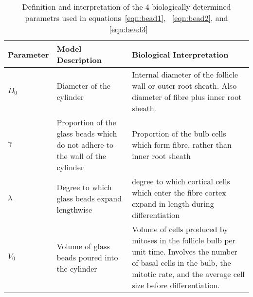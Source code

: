 %

\begin{table}[htp]
\centering
\caption{Definition and interpretation of the 4 biologically determined parametrs used in equations~\ref{eqn:bead1}, ~\ref{eqn:bead2}, and ~\ref{eqn:bead3}}
\label{tab:4param}
\vspace{0.1in}
\begin{tabular}{|p{0.6in}|p{2.0in}|p{2.2in}|}  \hline
     Parameter & Model Description  &  Biological Interpretation  \\ 
\hline 
  $D_{0}$  &  Diameter of the cylinder  &  Internal diameter of the follicle wall or outer root sheath.  Also diameter of fibre plus inner root sheath. \\
  $\gamma$ &  Proportion of the glass beads which do not adhere to the wall of the cylinder  &  Proportion of the bulb cells which form fibre, rather than inner root sheath \\
 $\lambda$ &  Degree to which glass beads expand lengthwise & degree to which cortical cells which enter the fibre cortex expand in length during differentiation \\
 $V_{0}$   &  Volume of glass beads poured into the cylinder & Volume of cells produced by mitoses in the follicle bulb per unit time. Involves the number of basal cells in the bulb, the mitotic rate, and the average cell size before differentiation. \\
\hline

\end{tabular}
\end{table}

%
